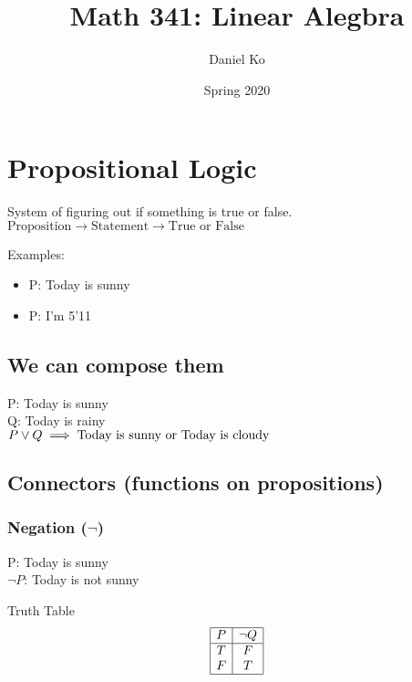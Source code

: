 \documentclass[a4paper]{article}
\title{Math 341: Linear Alegbra}
\author{Daniel Ko}
\date{Spring 2020}
\begin{document}
\maketitle


\section{Propositional Logic}

System of figuring out if something is true or false.
\\
$\text{Proposition} \rightarrow \text{Statement} \rightarrow \text{True or False}$

Examples:
\begin{itemize}
	\item P: Today is sunny 
	\item P: I'm 5'11
\end{itemize}

\subsection{We can compose them}
P: Today is sunny
\\
Q: Today is rainy
\\
$P \lor Q \implies \hbox{Today is sunny or Today is cloudy}$

\subsection{Connectors (functions on propositions)}

\subsubsection{Negation ($\lnot$)}

P: Today is sunny
\\
$\lnot P$: Today is not sunny

\begin{center}
	Truth Table
	\begin{displaymath}
		\begin{array}{|c|c|}
			\hline
			P & \lnot Q \\ 
			\hline
			T & F \\
			F & T \\
			\hline
		\end{array}
	\end{displaymath}
\end{center}
\end{document}

